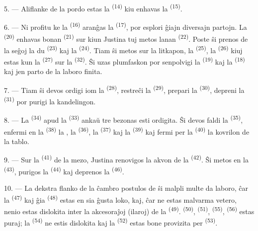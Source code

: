 5. --- Aliflanke de la pordo estas la 
\textsuperscript{(14)} kiu enhavas la 
\textsuperscript{(15)}.

6. --- Ni profitu ke la  \textsuperscript{(16)} aranĝas la
 \textsuperscript{(17)}, por esplori ĝiajn diversajn partojn. La
 \textsuperscript{(20)} enhavas bonan 
\textsuperscript{(21)} sur kiun Justina tuj metos lanan 
\textsuperscript{(22)}. Poste ŝi prenos de la seĝoj la du 
\textsuperscript{(23)} kaj la  \textsuperscript{(24)}. Tiam ŝi
metos sur la litkapon, la  \textsuperscript{(25)},
la  \textsuperscript{(26)} kiuj estas kun la
 \textsuperscript{(27)} sur la 
\textsuperscript{(32)}. Ŝi uzas plumfaskon por senpolvigi la 
\textsuperscript{(19)} kaj la  \textsuperscript{(18)} kaj
jen parto de la laboro finita.

7. --- Tiam ŝi devos ordigi iom la 
\textsuperscript{(28)}, restreĉi la  \textsuperscript{(29)},
prepari la  \textsuperscript{(30)}, depreni la
 \textsuperscript{(31)} por purigi la kandelingon.

\VUsaut{5.0mm}
\VUsaut{3.0mm}

8. --- La  \textsuperscript{(34)} apud la 
\textsuperscript{(33)} ankaŭ tre bezonas esti ordigita. Ŝi devos faldi la
 \textsuperscript{(35)}, enfermi en la 
\textsuperscript{(38)} la , la 
\textsuperscript{(36)}, la  \textsuperscript{(37)} kaj la
 \textsuperscript{(39)} kaj fermi per la 
\textsuperscript{(40)} la kovrilon de la tablo.

9. --- Sur la  \textsuperscript{(41)} de la mezo,
Justina renovigos la akvon de la  \textsuperscript{(42)}. Ŝi
metos  en la  \textsuperscript{(43)},
purigos la  \textsuperscript{(44)} kaj deprenos la
 \textsuperscript{(46)}.

10. --- La dekstra flanko de la ĉambro postulos de ŝi malpli multe da laboro,
ĉar la  \textsuperscript{(47)} kaj ĝia 
\textsuperscript{(48)} estas en sia ĝusta loko, kaj, ĉar ne estas malvarma
vetero, nenio estas dislokita inter la akcesoraĵoj (ilaroj) de la
 \textsuperscript{(49)}. 
\textsuperscript{(50)},  \textsuperscript{(51)},
 \textsuperscript{(55)}, 
\textsuperscript{(56)} estas puraj; la 
\textsuperscript{(54)} ne estis dislokita kaj la 
\textsuperscript{(52)} estas bone provizita per 
\textsuperscript{(53)}.

